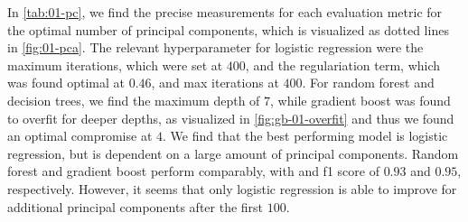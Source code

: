 In \autoref{tab:01-pc}, we find the precise measurements for each evaluation metric for the optimal number of principal components, which is visualized as dotted lines in \autoref{fig:01-pca}. The relevant hyperparameter for logistic regression were the maximum iterations, which were set at $400$, and the regulariation term, which was found optimal at $0.46$, and max iterations at $400$. For random forest and decision trees, we find the maximum depth of $7$, while gradient boost was found to overfit for deeper depths, as visualized in \autoref{fig:gb-01-overfit} and thus we found an optimal compromise at $4$. We find that the best performing model is logistic regression, but is dependent on a large amount of principal components. Random forest and gradient boost perform comparably, with and f1 score of $0.93$ and $0.95$, respectively. However, it seems that only logistic regression is able to improve for additional principal components after the first $100$.

